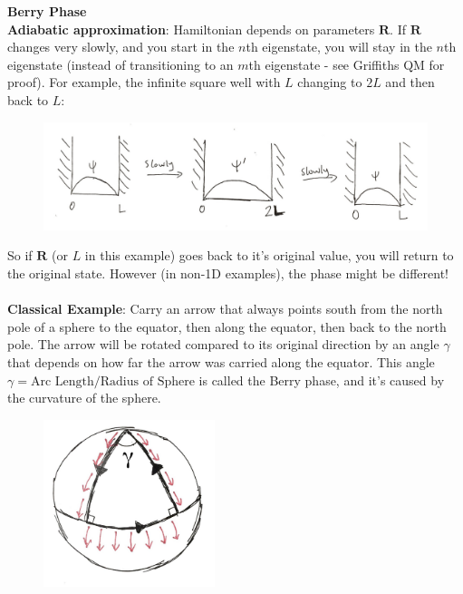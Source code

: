 \documentclass[a4paper,12pt]{article}
\renewcommand{\vec}[1]{\boldsymbol{\mathbf{#1}}}
\begin{document}
\textbf{\large Berry Phase} \\

\textbf{Adiabatic approximation}: Hamiltonian depends on parameters $\vec{R}$.  If $\vec{R}$ changes very slowly, and you start in the $n$th eigenstate, you will stay in the $n$th eigenstate (instead of transitioning to an $m$th eigenstate - see Griffiths QM for proof).  For example, the infinite square well with $L$ changing to $2L$ and then back to $L$:

\begin{figure}[h!]
\centering
\includegraphics[width=150mm,keepaspectratio=true]{infinitewell.jpg}
\end{figure}

So if $\vec{R}$ (or $L$ in this example) goes back to it's original value, you will return to the original state.  However (in non-1D examples), the phase might be different!
\\ \\
\textbf{Classical Example}: Carry an arrow that always points south from the north pole of a sphere to the equator, then along the equator, then back to the north pole.  The arrow will be rotated compared to its original direction by an angle $\gamma$ that depends on how far the arrow was carried along the equator.  This angle $\gamma = \text{Arc Length}/\text{Radius of Sphere}$ is called the Berry phase, and it's caused by the curvature of the sphere.
\\
\begin{figure}[h!]
\centering
\includegraphics[width=50mm,keepaspectratio=true]{geometric.jpg}
\end{figure}
\end{document}
